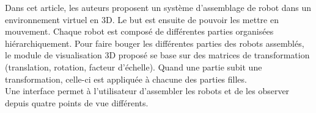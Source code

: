 Dans cet article, les auteurs proposent un système d'assemblage de robot dans un environnement virtuel en 3D. Le but est ensuite de pouvoir les mettre en mouvement. Chaque robot est composé de différentes parties organisées hiérarchiquement. Pour faire bouger les différentes parties des robots assemblés, le module de visualisation 3D proposé se base sur des matrices de transformation (translation, rotation, facteur d'échelle). Quand une partie subit une transformation, celle-ci est appliquée à chacune des parties filles. \\
Une interface permet à l'utilisateur d'assembler les robots et de les observer depuis quatre points de vue différents. 